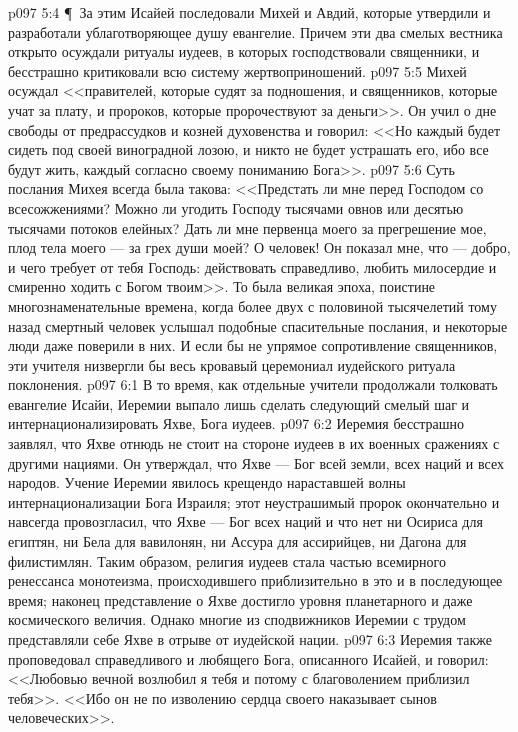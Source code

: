 \vs p097 5:4 \P\ За этим Исайей последовали Михей и Авдий, которые утвердили и разработали ублаготворяющее душу евангелие. Причем эти два смелых вестника открыто осуждали ритуалы иудеев, в которых господствовали священники, и бесстрашно критиковали всю систему жертвоприношений.
\vs p097 5:5 Михей осуждал <<правителей, которые судят за подношения, и священников, которые учат за плату, и пророков, которые пророчествуют за деньги>>. Он учил о дне свободы от предрассудков и козней духовенства и говорил: <<Но каждый будет сидеть под своей виноградной лозою, и никто не будет устрашать его, ибо все будут жить, каждый согласно своему пониманию Бога>>.
\vs p097 5:6 Суть послания Михея всегда была такова: <<Предстать ли мне перед Господом со всесожжениями? Можно ли угодить Господу тысячами овнов или десятью тысячами потоков елейных? Дать ли мне первенца моего за прегрешение мое, плод тела моего --- за грех души моей? О человек! Он показал мне, что --- добро, и чего требует от тебя Господь: действовать справедливо, любить милосердие и смиренно ходить с Богом твоим>>. То была великая эпоха, поистине многознаменательные времена, когда более двух с половиной тысячелетий тому назад смертный человек услышал подобные спасительные послания, и некоторые люди даже поверили в них. И если бы не упрямое сопротивление священников, эти учителя низвергли бы весь кровавый церемониал иудейского ритуала поклонения.
\vs p097 6:1 В то время, как отдельные учители продолжали толковать евангелие Исайи, Иеремии выпало лишь сделать следующий смелый шаг и интернационализировать Яхве, Бога иудеев.
\vs p097 6:2 Иеремия бесстрашно заявлял, что Яхве отнюдь не стоит на стороне иудеев в их военных сражениях с другими нациями. Он утверждал, что Яхве --- Бог всей земли, всех наций и всех народов. Учение Иеремии явилось крещендо нараставшей волны интернационализации Бога Израиля; этот неустрашимый пророк окончательно и навсегда провозгласил, что Яхве --- Бог всех наций и что нет ни Осириса для египтян, ни Бела для вавилонян, ни Ассура для ассирийцев, ни Дагона для филистимлян. Таким образом, религия иудеев стала частью всемирного ренессанса монотеизма, происходившего приблизительно в это и в последующее время; наконец представление о Яхве достигло уровня планетарного и даже космического величия. Однако многие из сподвижников Иеремии с трудом представляли себе Яхве в отрыве от иудейской нации.
\vs p097 6:3 Иеремия также проповедовал справедливого и любящего Бога, описанного Исайей, и говорил: <<Любовью вечной возлюбил я тебя и потому с благоволением приблизил тебя>>. <<Ибо он не по изволению сердца своего наказывает сынов человеческих>>.
